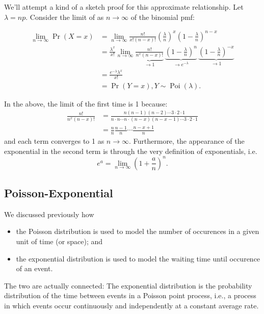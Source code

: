 \documentclass[
]{book}
\providecommand{\tightlist}{%
  \setlength{\itemsep}{0pt}\setlength{\parskip}{0pt}}
\DeclareMathOperator{\Pois}{Poi}
\theoremstyle{definition}
\theoremstyle{definition}
\theoremstyle{definition}
\theoremstyle{definition}
\theoremstyle{remark}
\begin{document}
We'll attempt a kind of a sketch proof for this approximate relationship.
Let \(\lambda=np\). Consider the limit of as \(n\to\infty\) of the binomial pmf:

\begin{align*}
\lim_{n\to\infty} \Pr(X=x) 
&= \lim_{n\to\infty} \frac{n!}{x!(n-x)!}\left(\frac{\lambda}{n} \right)^x \left(1 - \frac{\lambda}{n} \right)^{n-x} \\
&= \frac{\lambda^x}{x!} \lim_{n\to\infty} 
\underbrace{\frac{n!}{n^x(n-x)!}}_{\to 1}
\,
\underbrace{\left(1 - \frac{\lambda}{n} \right)^n}_{\to e^{-\lambda}}
\,
\underbrace{\left(1 - \frac{\lambda}{n} \right)^{-x}}_{\to 1} \\
&=  \frac{e^{-\lambda}\lambda^x}{x!} \\
&= \Pr(Y=x), Y\sim\Pois(\lambda).
\end{align*}

In the above, the limit of the first time is 1 because:
\begin{align*}
\frac{n!}{n^x(n-x)!}
&= \frac{n(n-1)(n-2)\cdots 3\cdot 2 \cdot 1}{n \cdot n \cdots n \cdot (n-x)(n-x-1)\cdots 3\cdot 2 \cdot 1} \\
&= \frac{n}{n}\frac{n-1}{n} \cdots \frac{n-x+1}{n}
\end{align*}
and each term converges to 1 as \(n\to\infty\).
Furthermore, the appearance of the exponential in the second term is through the very definition of exponentials, i.e.
\[
e^a = \lim_{n\to\infty }\left(1 + \frac{a}{n} \right)^n.
\]

\hypertarget{poisson-exponential}{%
\subsection{Poisson-Exponential}\label{poisson-exponential}}

We discussed previously how

\begin{itemize}
\tightlist
\item
  the Poisson distribution is used to model the number of occurences in a given unit of time (or space); and
\item
  the exponential distribution is used to model the waiting time until occurence of an event.
\end{itemize}

The two are actually connected: The exponential distribution is the probability distribution of the time between events in a Poisson point process, i.e., a process in which events occur continuously and independently at a constant average rate.
\end{document}
